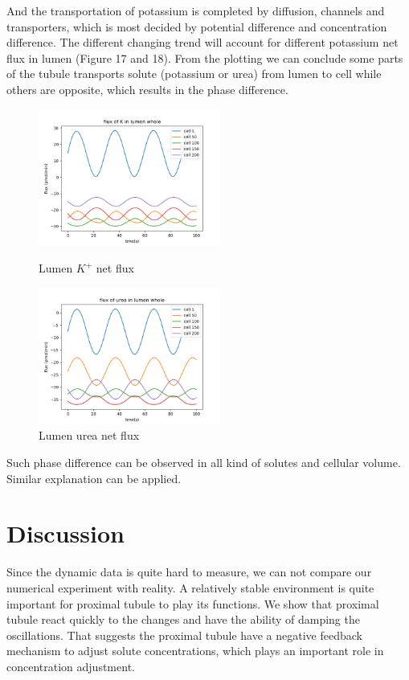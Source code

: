 \documentclass{article}
\begin{document}
And the transportation of potassium is completed by diffusion, channels and transporters, which is most decided by potential difference and concentration difference. The different changing trend will account for different potassium net flux in lumen (Figure 17 and 18). From the plotting we can conclude some parts of the tubule transports solute (potassium or urea) from lumen to cell while others are opposite, which results in the phase difference.
\begin{figure}[H]
\centering
\begin{minipage}[t]{0.48\textwidth}
\centering
\includegraphics[width=6cm]{figure/figure17.png}
\caption{Lumen $K^{+}$ net flux}
\end{minipage}
\begin{minipage}[t]{0.48\textwidth}
\centering
\includegraphics[width=6cm]{figure/figure18.png}
\caption{Lumen urea net flux}
\end{minipage}
\end{figure}
Such phase difference can be observed in all kind of solutes and cellular volume. Similar explanation can be applied.

\section{Discussion}
Since the dynamic data is quite hard to measure, we can not compare our numerical experiment with reality. A relatively stable environment is quite important for proximal tubule to play its functions. We show that proximal tubule react quickly to the changes and have the ability of damping the oscillations. That suggests the proximal tubule have a negative feedback mechanism to adjust solute concentrations, which plays an important role in concentration adjustment.




\end{document}
